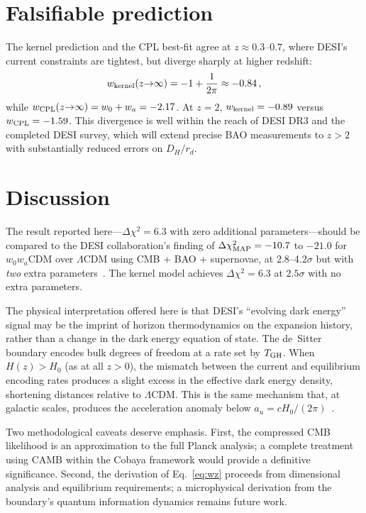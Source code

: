 \documentclass[aps,prl,twocolumn,showpacs,preprintnumbers,amsmath,amssymb,superscriptaddress]{revtex4-2}
\begin{document}
\section{Falsifiable prediction}

The kernel prediction and the CPL best-fit agree at $z \approx 0.3$--$0.7$, 
where DESI's current constraints are tightest, but diverge sharply at 
higher redshift:
\begin{equation}
w_{\rm kernel}(z{\to}\infty) = -1 + \frac{1}{2\pi} \approx -0.84\,,
\end{equation}
while $w_{\rm CPL}(z{\to}\infty) = w_0 + w_a = -2.17$. At $z=2$, 
$w_{\rm kernel} = -0.89$ versus $w_{\rm CPL} = -1.59$. This 
divergence is well within the reach of DESI DR3 and the completed 
DESI survey, which will extend precise BAO measurements to $z > 2$ 
with substantially reduced errors on $D_H/r_d$.

\section{Discussion}

The result reported here---$\Delta\chi^2 = 6.3$ with zero additional 
parameters---should be compared to the DESI collaboration's finding 
of $\Delta\chi^2_{\rm MAP} = -10.7$ to $-21.0$ for $w_0 w_a$CDM 
over $\Lambda$CDM using CMB + BAO + supernovae, at 2.8--4.2$\sigma$ 
but with \emph{two} extra parameters~\cite{DESI_DR2}. The kernel model 
achieves $\Delta\chi^2 = 6.3$ at $2.5\sigma$ with no extra parameters.

The physical interpretation offered here is that DESI's ``evolving dark energy'' 
signal may be the imprint of horizon thermodynamics on the expansion history, 
rather than a change in the dark energy equation of state. The 
de~Sitter boundary encodes bulk degrees of freedom at a rate set by 
$T_{\rm GH}$. When $H(z) > H_0$ (as at all $z > 0$), the mismatch 
between the current and equilibrium encoding rates produces a slight 
excess in the effective dark energy density, shortening distances 
relative to $\Lambda$CDM. This is the same mechanism that, at 
galactic scales, produces the acceleration anomaly below 
$a_u = cH_0/(2\pi)$~\cite{Paper1}.

Two methodological caveats deserve emphasis. First, the compressed 
CMB likelihood is an approximation to the full Planck analysis; a 
complete treatment using CAMB within the Cobaya framework would 
provide a definitive significance. Second, the derivation of 
Eq.~\eqref{eq:wz} proceeds from dimensional analysis and equilibrium 
requirements; a microphysical derivation from the boundary's quantum 
information dynamics remains future work.
\end{document}
